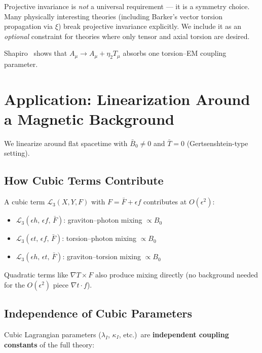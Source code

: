 \documentclass[12pt,a4paper]{article}
\newcommand{\del}{\nabla}            %
\begin{document}
Projective invariance is \emph{not} a universal requirement ---
it is a symmetry choice. Many physically interesting theories
(including Barker's vector torsion propagation via $\xi$) break
projective invariance explicitly. We include it as an \emph{optional}
constraint for theories where only tensor and axial torsion are desired.

Shapiro~\cite{Shapiro:2001rz} shows that
$A_\mu \to A_\mu + \eta_2 T_\mu$ absorbs one torsion--EM coupling
parameter.


\section{Application: Linearization Around a Magnetic Background}
\label{sec:background}

We linearize around flat spacetime with $\bar{B}_0 \neq 0$ and
$\bar{T} = 0$ (Gertsenshtein-type setting).

\subsection{How Cubic Terms Contribute}

A cubic term $\mathcal{L}_3(X, Y, F)$ with $F = \bar{F} + \epsilon f$
contributes at $O(\epsilon^2)$:
\begin{itemize}
  \item $\mathcal{L}_3(\epsilon h,\, \epsilon f,\, \bar{F})$:
    graviton--photon mixing $\propto B_0$
  \item $\mathcal{L}_3(\epsilon t,\, \epsilon f,\, \bar{F})$:
    torsion--photon mixing $\propto B_0$
  \item $\mathcal{L}_3(\epsilon h,\, \epsilon t,\, \bar{F})$:
    graviton--torsion mixing $\propto B_0$
\end{itemize}
Quadratic terms like $\del T \times F$ also produce mixing directly
(no background needed for the $O(\epsilon^2)$ piece $\del t \cdot f$).


\subsection{Independence of Cubic Parameters}
\label{sec:cubic_independence}

Cubic Lagrangian parameters ($\lambda_I$, $\kappa_I$, etc.)\ are
\textbf{independent coupling constants} of the full theory:
\end{document}

